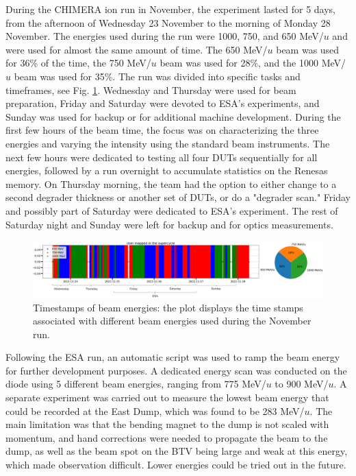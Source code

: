 \documentclass{cernatsnote}
\begin{document}
During the CHIMERA ion run in November, the experiment lasted for 5 days, from the afternoon of Wednesday 23 November to the  morning of Monday 28 November. The energies used during the run were 1000, 750, and 650 MeV/$u$ and were used for almost the same amount of time. The 650 MeV/$u$ beam was used for 36\% of the time, the 750 MeV/$u$ beam was used for 28\%, and the 1000 MeV/$u$ beam was used for 35\%. The run was divided into specific tasks and timeframes, see Fig. \ref{fig:timestamp_energies}. Wednesday and Thursday were used for beam preparation, Friday and Saturday were devoted to ESA's experiments, and Sunday was used for backup or for additional machine development. During the first few hours of the beam time, the focus was on characterizing the three energies and varying the intensity using the standard beam instruments. The next few hours were dedicated to testing all four DUTs sequentially for all energies, followed by a run overnight to accumulate statistics on the Renesas memory. On Thursday morning, the team had the option to either change to a second degrader thickness or another set of DUTs, or do a "degrader scan." Friday and possibly part of Saturday were dedicated to ESA's experiment. The rest of Saturday night and Sunday were left for backup and for optics measurements.

\begin{figure}[!htb]
\centering
\includegraphics[width=1.0\textwidth]{images/PS_BEAM_ENERGY/user_mapping_timestamp.png}
\caption{Timestamps of beam energies: the plot displays the time stamps associated with different beam energies used during the November run.}
\label{fig:timestamp_energies}
\end{figure}

Following the ESA run, an automatic script was used to ramp the beam energy for further development purposes. A dedicated energy scan was conducted on the diode using 5 different beam energies, ranging from 775 MeV/$u$ to 900 MeV/$u$. A separate experiment was carried out to measure the lowest beam energy that could be recorded at the East Dump, which was found to be 283 MeV/$u$. The main limitation was that the bending magnet to the dump is not scaled with momentum, and hand corrections were needed to propagate the beam to the dump, as well as the beam spot on the BTV being large and weak at this energy, which made observation difficult. Lower energies could be tried out in the future.
\end{document}
